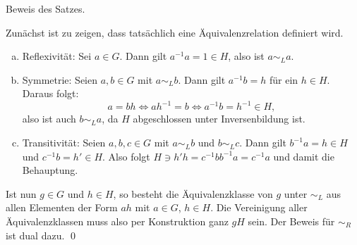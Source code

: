 \begin{übung}
Beweis des Satzes.
\end{übung}
\begin{lösung}
Zunächst ist zu zeigen, dass tatsächlich eine Äquivalenzrelation definiert wird.\\
\begin{enumerate}[(a)]
\item Reflexivität: Sei $a \in G$. Dann gilt $a^{-1}a = 1 \in H$, also ist $a \sim_L a$.
\item Symmetrie: Seien $a,b \in G$ mit $a \sim_L b$. Dann gilt $a^{-1} b = h$ für ein $h \in H$. Daraus folgt:
\begin{equation}
a = bh \iff ah^{-1} =b \iff a^{-1}b = h^{-1} \in H,
\end{equation}
also ist auch $b \sim_L a$, da $H$ abgeschlossen unter Inversenbildung ist.
\item Transitivität: Seien $a,b,c \in G$ mit $a \sim_L b$ und $b \sim_L c$. Dann gilt $b^{-1}a = h \in H$ und $c^{-1} b = h' \in H$. Also folgt $H \ni h'h = c^{-1}bb^{-1}a = c^{-1} a$ und damit die Behauptung.
\end{enumerate}
Ist nun $g \in G$ und $h \in H$, so besteht die Äquivalenzklasse von $g$ unter $\sim_L$ aus allen Elementen der Form $ah$ mit $a \in G$, $h \in H$. Die Vereinigung aller Äquivalenzklassen muss also per Konstruktion ganz $gH$ sein. Der Beweis für $\sim_R$ ist dual dazu. \qed
\end{lösung}

